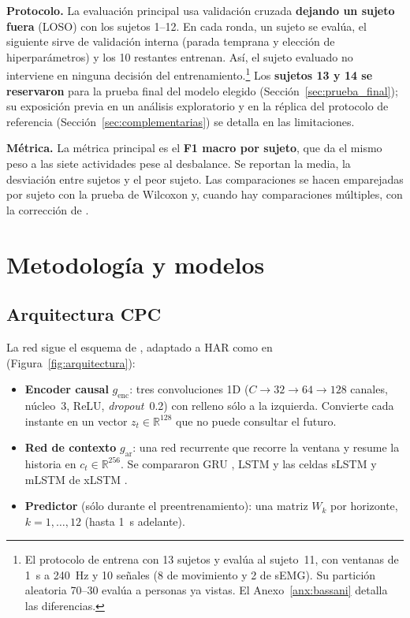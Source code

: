 \documentclass[letterpaper,11pt]{article}
\begin{document}
\textbf{Protocolo.} La evaluación principal usa validación cruzada \textbf{dejando un sujeto fuera} (LOSO) con los sujetos 1--12. En cada ronda, un sujeto se evalúa, el siguiente sirve de validación interna (parada temprana y elección de hiperparámetros) y los 10 restantes entrenan. Así, el sujeto evaluado no interviene en ninguna decisión del entrenamiento.\footnote{El protocolo de \textcite{bassani2025} entrena con 13 sujetos y evalúa al sujeto~11, con ventanas de 1~s a 240~Hz y 10 señales (8 de movimiento y 2 de sEMG). Su partición aleatoria 70--30 evalúa a personas ya vistas. El Anexo~\ref{anx:bassani} detalla las diferencias.} Los \textbf{sujetos 13 y 14 se reservaron} para la prueba final del modelo elegido (Sección~\ref{sec:prueba_final}); su exposición previa en un análisis exploratorio y en la réplica del protocolo de referencia (Sección~\ref{sec:complementarias}) se detalla en las limitaciones.

\textbf{Métrica.} La métrica principal es el \textbf{F1 macro por sujeto}, que da el mismo peso a las siete actividades pese al desbalance. Se reportan la media, la desviación entre sujetos y el peor sujeto. Las comparaciones se hacen emparejadas por sujeto con la prueba de Wilcoxon \parencite{wilcoxon1945} y, cuando hay comparaciones múltiples, con la corrección de \textcite{holm1979}.

\section{Metodología y modelos}

\subsection{Arquitectura CPC}
\label{sec:cpc}
La red sigue el esquema de \textcite{vandenoord2018}, adaptado a HAR como en \textcite{haresamudram2021} (Figura~\ref{fig:arquitectura}):

\begin{itemize}
  \item \textbf{Encoder causal} $g_{\text{enc}}$: tres convoluciones 1D ($C \to 32 \to 64 \to 128$ canales, núcleo~3, ReLU, \emph{dropout}~0.2) con relleno sólo a la izquierda. Convierte cada instante en un vector $z_t \in \mathbb{R}^{128}$ que no puede consultar el futuro.
  \item \textbf{Red de contexto} $g_{\text{ar}}$: una red recurrente que recorre la ventana y resume la historia en $c_t \in \mathbb{R}^{256}$. Se compararon GRU \parencite{cho2014}, LSTM \parencite{hochreiter1997} y las celdas sLSTM y mLSTM de xLSTM \parencite{beck2024}.
  \item \textbf{Predictor} (sólo durante el preentrenamiento): una matriz $W_k$ por horizonte, $k = 1,\dots,12$ (hasta 1~s adelante).
\end{itemize}
\end{document}
